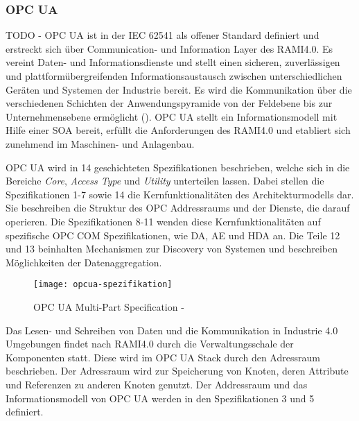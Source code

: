 \subsubsection{\ac{OPC UA}}
TODO - \ac{OPC UA} ist in der \ac{IEC} 62541 als offener Standard definiert und erstreckt sich über Communication- und Information Layer des \ac{RAMI4.0}. Es vereint Daten- und Informationsdienste und stellt einen sicheren, zuverlässigen und plattformübergreifenden Informationsaustausch zwischen unterschiedlichen Geräten und Systemen der Industrie bereit. Es wird die Kommunikation über die verschiedenen Schichten der Anwendungspyramide von der Feldebene bis zur Unternehmensebene ermöglicht (\cite{OPCWegbereiter2014}). \ac{OPC UA} stellt ein Informationsmodell mit Hilfe einer \ac{SOA} bereit, erfüllt die Anforderungen des \ac{RAMI4.0} und etabliert sich zunehmend im Maschinen- und Anlagenbau.

\ac{OPC UA} wird in 14 geschichteten Spezifikationen beschrieben, welche sich in die Bereiche \textit{Core}, \textit{Access Type} und \textit{Utility} unterteilen lassen. Dabei stellen die Spezifikationen 1-7 sowie 14 die Kernfunktionalitäten des Architekturmodells dar. Sie beschreiben die Struktur des OPC Addressraums und der Dienste, die darauf operieren. Die Spezifikationen 8-11 wenden diese Kernfunktionalitäten auf spezifische \ac{OPC COM} Spezifikationen, wie \ac{DA}, \ac{AE} und \ac{HDA} an. Die Teile 12 und 13 beinhalten Mechanismen zur Discovery von Systemen und beschreiben Möglichkeiten der Datenaggregation.

\begin{figure}[h]
  \centering
  \texttt{[image: opcua-spezifikation]}
  \caption{OPC UA Multi-Part Specification - \cite{opcpt1}} 
  \label{Kap2:OPC UA Multi-Part Specification}
\end{figure}

\clearpage

Das Lesen- und Schreiben von Daten und die Kommunikation in Industrie 4.0 Umgebungen findet nach \ac{RAMI4.0} durch die Verwaltungsschale der Komponenten statt. Diese wird im \ac{OPC UA} Stack durch den Adressraum beschrieben. Der Adressraum wird zur Speicherung von Knoten, deren Attribute und Referenzen zu anderen Knoten genutzt. Der Addressraum und das Informationsmodell von \ac{OPC UA} werden in den Spezifikationen 3 \cite{opcpc3} und 5 \cite{opcpt5} definiert.

